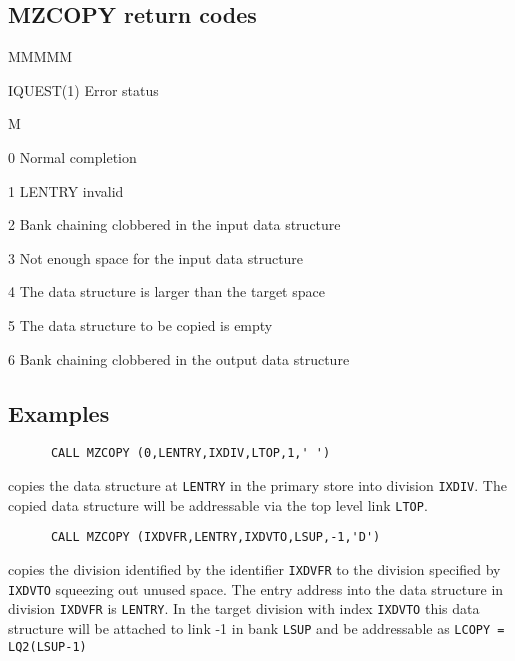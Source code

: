 \subsection{MZCOPY return codes}
\begin{DL}{MMMMM}
\item[IQUEST(1)]Error status
\begin{DL}{M}
\item[0]Normal completion
\item[1]LENTRY invalid
\item[2]Bank chaining clobbered in the input data structure
\item[3]Not enough space for the input data structure
\item[4]The data structure is larger than the target space
\item[5]The data structure to be copied is empty
\item[6]Bank chaining clobbered in the output data structure
\end{DL}
\end{DL}
\subsection{Examples}
\begin{verbatim}
      CALL MZCOPY (0,LENTRY,IXDIV,LTOP,1,' ')
\end{verbatim}
copies the data structure at {\tt LENTRY} in the primary store into division
{\tt IXDIV}. The copied data structure will be addressable via the
top level link {\tt LTOP}.
\begin{verbatim}
      CALL MZCOPY (IXDVFR,LENTRY,IXDVTO,LSUP,-1,'D')
\end{verbatim}
copies the division identified by the identifier {\tt IXDVFR} to the division
specified by {\tt IXDVTO} squeezing out unused space.
The entry address into the
data structure in division {\tt IXDVFR} is {\tt LENTRY}.
In the target division
with index {\tt IXDVTO} this data structure will be attached to link -1
in bank {\tt LSUP} and be addressable as {\tt LCOPY = LQ2(LSUP-1)}
